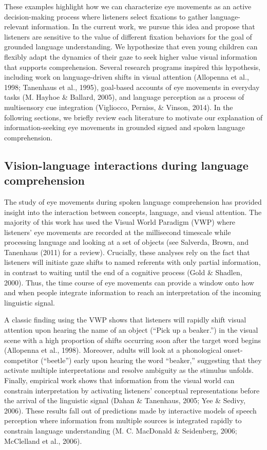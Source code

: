 \documentclass[oneside]{report}
\begin{document}
These examples highlight how we can characterize eye movements as an
active decision-making process where listeners select fixations to
gather language-relevant information. In the current work, we pursue
this idea and propose that listeners are sensitive to the value of
different fixation behaviors for the goal of grounded language
understanding. We hypothesize that even young children can flexibly
adapt the dynamics of their gaze to seek higher value visual information
that supports comprehension. Several research programs inspired this
hypothesis, including work on language-driven shifts in visual attention
(Allopenna et al., 1998; Tanenhaus et al., 1995), goal-based accounts of
eye movements in everyday tasks (M. Hayhoe \& Ballard, 2005), and
language perception as a process of multisensory cue integration
(Vigliocco, Perniss, \& Vinson, 2014). In the following sections, we
briefly review each literature to motivate our explanation of
information-seeking eye movements in grounded signed and spoken language
comprehension.

\subsection{Vision-language interactions during language
comprehension}\label{vision-language-interactions-during-language-comprehension}

The study of eye movements during spoken language comprehension has
provided insight into the interaction between concepts, language, and
visual attention. The majority of this work has used the Visual World
Paradigm (VWP) where listeners' eye movements are recorded at the
millisecond timescale while processing language and looking at a set of
objects (see Salverda, Brown, and Tanenhaus (2011) for a review).
Crucially, these analyses rely on the fact that listeners will initiate
gaze shifts to named referents with only partial information, in
contrast to waiting until the end of a cognitive process (Gold \&
Shadlen, 2000). Thus, the time course of eye movements can provide a
window onto how and when people integrate information to reach an
interpretation of the incoming linguistic signal.

A classic finding using the VWP shows that listeners will rapidly shift
visual attention upon hearing the name of an object (``Pick up a
beaker.'') in the visual scene with a high proportion of shifts
occurring soon after the target word begins (Allopenna et al., 1998).
Moreover, adults will look at a phonological onset-competitor
(``beetle'') early upon hearing the word ``beaker,'' suggesting that
they activate multiple interpretations and resolve ambiguity as the
stimulus unfolds. Finally, empirical work shows that information from
the visual world can constrain interpretation by activating listeners'
conceptual representations before the arrival of the linguistic signal
(Dahan \& Tanenhaus, 2005; Yee \& Sedivy, 2006). These results fall out
of predictions made by interactive models of speech perception where
information from multiple sources is integrated rapidly to constrain
language understanding (M. C. MacDonald \& Seidenberg, 2006; McClelland
et al., 2006).
\end{document}
